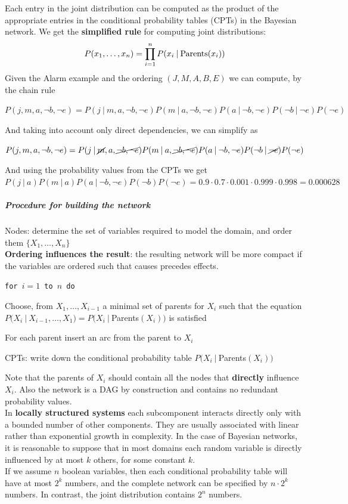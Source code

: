 \documentclass[10pt]{report}
\begin{document}
Each entry in the joint distribution can be computed as the product of the appropriate entries in the conditional probability tables (CPTs) in the Bayesian network. We get the \textbf{simplified rule} for computing joint distributions: $$P(x_1,\ldots,x_n) = \prod_{i=1}^n P(x_i\:|\:\hbox{Parents}(x_i))$$
Given the Alarm example and the ordering $(J,M,A,B,E)$ we can compute, by the chain rule \begin{list}{}{}
	\item $P(j,m,a,\neg b, \neg e) = P(j\:|\:m,a,\neg b, \neg e)P(m\:|\:a,\neg b, \neg e)P(a\:|\:\neg b, \neg e)P(\neg b\:|\:\neg e)P(\neg e)$
\end{list}
And taking into account only direct dependencies, we can simplify as \begin{list}{}{}
	\item $P(j,m,a,\neg b, \neg e) = P(j\:|\:\cancel{m},a,\cancel{\neg b, \neg e})P(m\:|\:a,\cancel{\neg b, \neg e})P(a\:|\:\neg b, \neg e)P(\neg b\:|\:\cancel{\neg e})P(\neg e)$
\end{list}
And using the probability values from the CPTs we get $P(j\:|\:a)P(m\:|\:a)P(a\:|\:\neg b,\neg e)P(\neg b)P(\neg e) = 0.9\cdot0.7\cdot0.001\cdot0.999\cdot0.998=0.000628$
\subparagraph{Procedure for building the network}
\begin{list}{}{}
	\item Nodes: determine the set of variables required to model the domain, and order them $\{X_1,\ldots,X_n\}$\\
	\textbf{Ordering influences the result}: the resulting network will be more compact if the variables are ordered such that causes precedes effects.
	\item \texttt{for $i=1$ to $n$ do}
	\begin{list}{}{}
		\item Choose, from $X_1,\ldots,X_{i-1}$ a minimal set of parents for $X_i$ such that the equation $P(X_i\:|\:X_{i-1},\ldots,X_1) = P(X_i\:|\:$Parents$(X_i))$ is satisfied
		\item For each parent insert an arc from the parent to $X_i$
		\item CPTs: write down the conditional probability table $P(X_i\:|\:$Parents$(X_i))$
	\end{list}
\end{list}
Note that the parents of $X_i$ should contain all the nodes that \textbf{directly} influence $X_i$. Also the network is a DAG by construction and contains no redundant probability values.\\
In \textbf{locally structured systems} each subcomponent interacts directly only with a bounded number of other components. They are usually associated with linear rather than exponential growth in complexity. In the case of Bayesian networks, it is reasonable to suppose that in most domains each random variable is directly influenced by at most $k$ others, for some constant $k$.\\
If we assume $n$ boolean variables, then each conditional probability table will have at most $2^k$ numbers, and the complete network can be specified by $n\cdot2^k$ numbers. In contrast, the joint distribution contains $2^n$ numbers.
\end{document}

